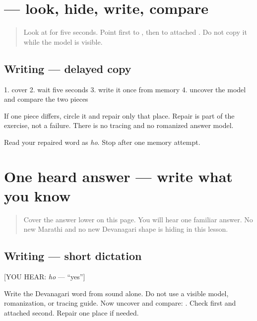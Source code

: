 \section[ho]{ — look, hide, write, compare}

\label{lesson:MR-W01-ho-delayed-copy}



\begin{quote}
Look at \textbf{} for five seconds. Point first to \textbf{}, then to attached \textbf{}. Do not copy it while the model is visible.
\end{quote}

\subsection*{Writing — delayed copy}
1. cover \textbf{} 2. wait five seconds 3. write it once from memory 4. uncover the model and compare the two pieces

If one piece differs, circle it and repair only that place. Repair is part of the exercise, not a failure. There is no tracing and no romanized answer model.

\begin{tcolorbox}[breakable,colback=teal!4,colframe=teal!35!black,title={Before you move on}]
Read your repaired word as \emph{ho}. Stop after one memory attempt.
\end{tcolorbox}
\section[ho]{One heard answer — write what you know}

\label{lesson:MR-W01-ho-dictation}



\begin{quote}
Cover the answer lower on this page. You will hear one familiar answer. No new Marathi and no new Devanagari shape is hiding in this lesson.
\end{quote}

\subsection*{Writing — short dictation}
{[}YOU HEAR: \emph{ho} — \textquotedblleft{}yes\textquotedblright{}{]}

Write the Devanagari word from sound alone. Do not use a visible model, romanization, or tracing guide. Now uncover and compare: \textbf{}. Check \textbf{} first and attached \textbf{} second. Repair one place if needed.

